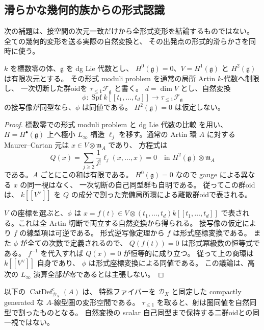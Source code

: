 \subsection{滑らかな幾何的族からの形式認識}

次の補題は、接空間の次元一致だけから全形式変形を結論するものではない。
全ての幾何的変形を送る実際の自然変換と、
その出発点の形式的滑らかさを同時に使う。

\begin{lemma}[滑らかな源と接写像同型]
\label{lem:nf-smooth-source}
$k$ を標数零の体、$\mathfrak g$ を dg Lie 代数とし、
$H^0(\mathfrak g)=0$、$V=H^1(\mathfrak g)$ と
$H^2(\mathfrak g)$ は有限次元とする。
その形式 moduli problem を通常の局所 Artin $k$-代数へ制限し、
一次切断した群oidを $\tau_{\leq1}\mathcal F_{\mathfrak g}$ と書く。
$d=\dim V$ とし、自然変換
\[
 \phi:\operatorname{Spf}k[[t_1,\ldots,t_d]]
       \longrightarrow\tau_{\leq1}\mathcal F_{\mathfrak g}
\]
の接写像が同型なら、$\phi$ は同値である。
$H^2(\mathfrak g)=0$ は仮定しない。
\end{lemma}

\begin{proof}
標数零での形式 moduli problem と dg Lie 代数の比較
\cite[Section~2]{NFDAGX} を用い、
$H=H^\bullet(\mathfrak g)$ 上へ極小 $L_\infty$ 構造
$\ell_j$ を移す。通常の Artin 環 $A$ に対する
Maurer--Cartan 元は $x\in V\otimes\mathfrak m_A$ であり、
方程式は
\begin{equation}
\label{eq:nf-mc}
 Q(x)=\sum_{j\geq2}\frac1{j!}\ell_j(x,\ldots,x)=0
       \quad\text{in }H^2(\mathfrak g)\otimes\mathfrak m_A
\end{equation}
である。$A$ ごとにこの和は有限である。
$H^0(\mathfrak g)=0$ なので gauge による異なる $x$ の同一視はなく、
一次切断の自己同型群も自明である。
従ってこの群oidは、
$k[[V^\vee]]$ を $Q$ の成分で割った完備局所環による離散群oidで表される。

$V$ の座標を選ぶと、$\phi$ は
$x=f(t)\in V\otimes(t_1,\ldots,t_d)k[[t_1,\ldots,t_d]]$
で表される。これは全 Artin 切断で両立する自然変換から得られる。
接写像の仮定により $f$ の線型項は可逆である。
形式逆写像定理から $f$ は形式座標変換である。
また $\phi$ が全ての次数で定義されるので、
$Q(f(t))=0$ は形式冪級数の恒等式である。
$f^{-1}$ を代入すれば $Q(x)=0$ が恒等的に成り立つ。
従って上の商環は $k[[V^\vee]]$ 自身であり、
$\phi$ は形式座標変換による同値である。
この議論は、高次の $L_\infty$ 演算全部が零であるとは主張しない。
\end{proof}

以下の $\operatorname{CatDef}^{c}_{\mathcal D_X}(A)$ は、
特殊ファイバーを $\mathcal D_X$ と同定した
compactly generated な $A$-線型圏の変形空間である。
$\tau_{\leq1}$ を取ると、射は圏同値を自然同型で割ったものとなる。
自然変換の scalar 自己同型まで保持する二群oidとの同一視ではない。

